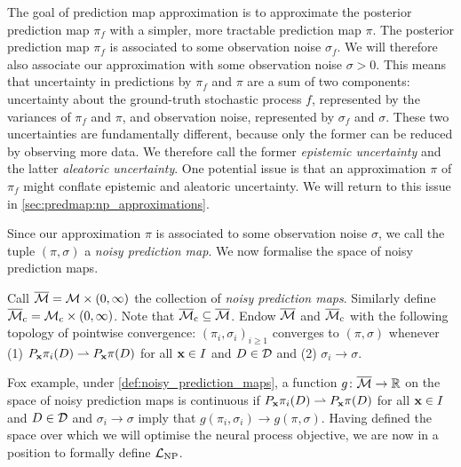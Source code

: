 \documentclass[12pt, twoside]{report}
\begin{document}
The goal of prediction map approximation is to approximate the posterior prediction map $\pi_f$ with a simpler, more tractable prediction map $\pi$.
The posterior prediction map $\pi_f$ is associated to some observation noise $\sigma_f$.
We will therefore also associate our approximation with some observation noise $\sigma > 0$.
This means that uncertainty in predictions by $\pi_f$ and $\pi$ are a sum of two components:
uncertainty about the ground-truth stochastic process $f$, represented by the variances of $\pi_f$ and $\pi$,
and observation noise, represented by $\sigma_f$ and $\sigma$.
These two uncertainties are fundamentally different,
because only the former can be reduced by observing more data.
We therefore call the former \emph{epistemic uncertainty} and the latter \emph{aleatoric uncertainty}.
One potential issue is that an approximation $\pi$ of $\pi_f$ might conflate epistemic and aleatoric uncertainty.
We will return to this issue in \cref{sec:predmap:np_approximations}.

Since our approximation $\pi$ is associated to some observation noise $\sigma$, we call the tuple $(\pi, \sigma)$ a \emph{noisy prediction map}.
We now formalise the space of noisy prediction maps.

\begin{definition} \label{def:noisy_prediction_maps}
    Call $\overline{\mathcal{M}} = \mathcal{M} \times (0, \infty)$ the collection of \emph{noisy prediction maps}.
    Similarly define $\overline{\M}\ss{c} = \M\ss{c} \times (0, \infty)$.
    Note that $\overline{\M}\ss{c} \sub \overline{\M}$.
    Endow $\overline{\mathcal{M}}$ and $\overline{\M}\ss{c}$ with the following topology of pointwise convergence:
    $(\pi_i, \sigma_i)_{i \ge 1}$ converges to $(\pi, \sigma)$ whenever
    (1) $P_{\mathbf{x}} \pi_i(D)\rightharpoonup P_{\mathbf{x}}\pi(D)$ for all $\mathbf{x} \in I$ and $D \in \mathcal{D}$ and
    (2) $\sigma_i\to \sigma$.
\end{definition}

Fox example, under \cref{def:noisy_prediction_maps}, a function $g \colon \overline{\mathcal{M}} \to \mathbb{R}$ on the space of noisy prediction maps is continuous if $P_{\mathbf{x}} \pi_i(D) \rightharpoonup P_{\mathbf{x}}\pi(D)$ for all $\mathbf{x} \in I$ and $D \in \mathcal{D}$ and $\sigma_i \to \sigma$ imply that $g(\pi_i, \sigma_i) \to g(\pi, \sigma)$.
Having defined the space over which we will optimise the neural process objective,
we are now in a position to formally define $\L\ss{NP}$.
\end{document}
